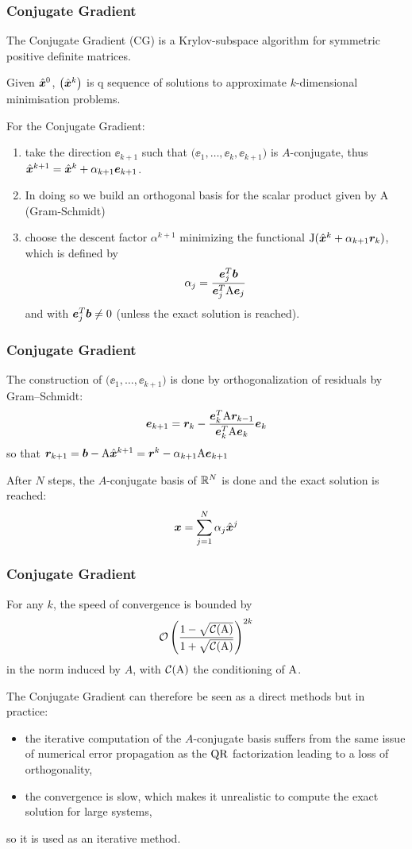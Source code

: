 \begin{frame}
  \frametitle{Conjugate Gradient}

The Conjugate Gradient (CG) is a Krylov-subspace algorithm for symmetric positive definite matrices.

\medskip
Given $\hat{\boldsymbol x}^0$, $\bigl(\hat{\boldsymbol x}^k\bigr)$ is q sequence of solutions to approximate $k$-dimensional minimisation problems.

\medskip
For the Conjugate Gradient:
\begin{enumerate}
\item take the direction $\ee_{k+1}$ such that $\bigl(\ee_1, \dots, \ee_{k}, \ee_{k+1}\bigr)$ is $A$-conjugate, thus $\hat{\boldsymbol x}^{k+1} = \hat{\boldsymbol x}^{k} + \alpha_{k+1} {\boldsymbol e}_{k+1}$.
\item In doing so we build an orthogonal basis for the scalar product given by A (Gram-Schmidt)
\item choose the descent factor $\alpha^{k+1}$ minimizing the functional ${\rm J}(\hat{\boldsymbol x}^{k} + \alpha_{k+1} {\boldsymbol r}_k)$, which is defined by
\[
\alpha_j = \frac{{\boldsymbol e}^T_j{\boldsymbol b}}{{\boldsymbol e}^T_j{\mathrm A}{\boldsymbol e}_j}
\]
and with ${\boldsymbol e}^T_j{\boldsymbol b} \neq 0$ (unless the exact solution is reached).
\end{enumerate}

\end{frame}

\begin{frame}
  \frametitle{Conjugate Gradient}

\medskip
The construction of $\bigl(\ee_1, \dots, \ee_{k+1}\bigr)$ is done by orthogonalization of residuals by Gram--Schmidt:
\[
{\boldsymbol e}_{k+1} = {\boldsymbol r}_k - \frac{{\boldsymbol e}^T_k{\mathrm A}{\boldsymbol r}_{k-1}}{{\boldsymbol e}^T_k{\mathrm A}{\boldsymbol e}_k}{\boldsymbol e}_k
\]
so that ${\boldsymbol r}_{k+1} = {\boldsymbol b} - {\mathrm A}\hat{\boldsymbol x}^{k+1} = {\boldsymbol r}^k - \alpha_{k+1}{\mathrm A}{\boldsymbol e}_{k+1}$

\medskip
After $N$ steps, the $A$-conjugate basis of ${\mathbb{R}^N}$ is done and the exact solution is reached:
\[
 {\boldsymbol x} = \sum_{j=1}^N \alpha_j \hat{\boldsymbol x}^j
\]

\end{frame}

\begin{frame}
  \frametitle{Conjugate Gradient}

For any $k$, the speed of convergence is bounded by
\[
\mathcal{O}\left( \frac{ 1-\sqrt{\mathcal{C}({\mathrm A})} } { 1+\sqrt{\mathcal{C}({\mathrm A})} } \right)^{2k}
\]
in the norm induced by $A$, with $\mathcal{C}({\mathrm A})$ the conditioning of ${\mathrm A}$.

\medskip
The Conjugate Gradient can therefore be seen as a direct methods but in practice:
\begin{itemize}
\item the iterative computation of the $A$-conjugate basis suffers from the same issue of numerical error propagation as the ${\mathrm Q}{\mathrm R}$ factorization leading to a loss of orthogonality,
\item the convergence is slow, which makes it unrealistic to compute the exact solution for large systems,
\end{itemize}
so it is used as an iterative method.

\end{frame}

